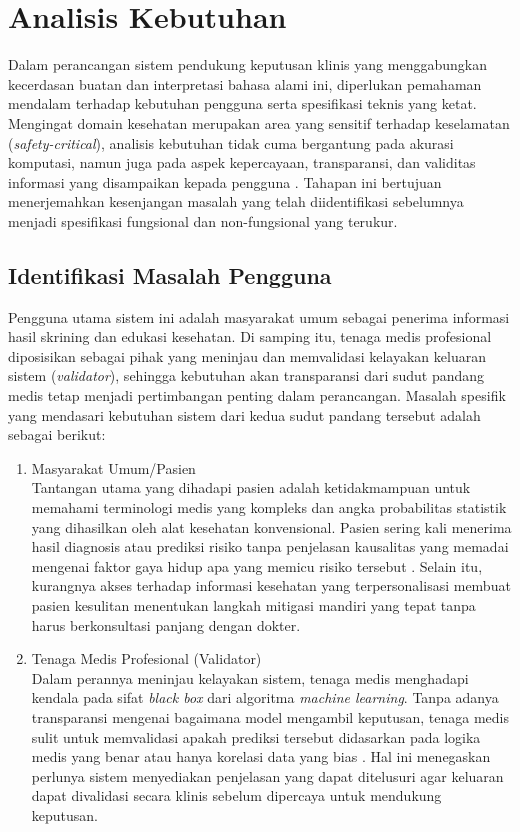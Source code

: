 \section{Analisis Kebutuhan}
Dalam perancangan sistem pendukung keputusan klinis yang menggabungkan kecerdasan buatan dan interpretasi bahasa alami ini, diperlukan pemahaman mendalam terhadap kebutuhan pengguna serta spesifikasi teknis yang ketat. Mengingat domain kesehatan merupakan area yang sensitif terhadap keselamatan (\emph{safety-critical}), analisis kebutuhan tidak cuma bergantung pada akurasi komputasi, namun juga pada aspek kepercayaan, transparansi, dan validitas informasi yang disampaikan kepada pengguna \autocite{Amann2020Explainability}. Tahapan ini bertujuan menerjemahkan kesenjangan masalah yang telah diidentifikasi sebelumnya menjadi spesifikasi fungsional dan non-fungsional yang terukur.

\subsection{Identifikasi Masalah Pengguna}
Pengguna utama sistem ini adalah masyarakat umum sebagai penerima informasi hasil skrining dan edukasi kesehatan. Di samping itu, tenaga medis profesional diposisikan sebagai pihak yang meninjau dan memvalidasi kelayakan keluaran sistem (\emph{validator}), sehingga kebutuhan akan transparansi dari sudut pandang medis tetap menjadi pertimbangan penting dalam perancangan. Masalah spesifik yang mendasari kebutuhan sistem dari kedua sudut pandang tersebut adalah sebagai berikut:

\begin{enumerate}
    \item Masyarakat Umum/Pasien\\
    Tantangan utama yang dihadapi pasien adalah ketidakmampuan untuk memahami terminologi medis yang kompleks dan angka probabilitas statistik yang dihasilkan oleh alat kesehatan konvensional. Pasien sering kali menerima hasil diagnosis atau prediksi risiko tanpa penjelasan kausalitas yang memadai mengenai faktor gaya hidup apa yang memicu risiko tersebut \autocite{Adadi2018}. Selain itu, kurangnya akses terhadap informasi kesehatan yang terpersonalisasi membuat pasien kesulitan menentukan langkah mitigasi mandiri yang tepat tanpa harus berkonsultasi panjang dengan dokter.
    
    \item Tenaga Medis Profesional (Validator)\\
    Dalam perannya meninjau kelayakan sistem, tenaga medis menghadapi kendala pada sifat \textit{black box} dari algoritma \textit{machine learning}. Tanpa adanya transparansi mengenai bagaimana model mengambil keputusan, tenaga medis sulit untuk memvalidasi apakah prediksi tersebut didasarkan pada logika medis yang benar atau hanya korelasi data yang bias \autocite{Linardatos2021Explainable}. Hal ini menegaskan perlunya sistem menyediakan penjelasan yang dapat ditelusuri agar keluaran dapat divalidasi secara klinis sebelum dipercaya untuk mendukung keputusan.
\end{enumerate}

